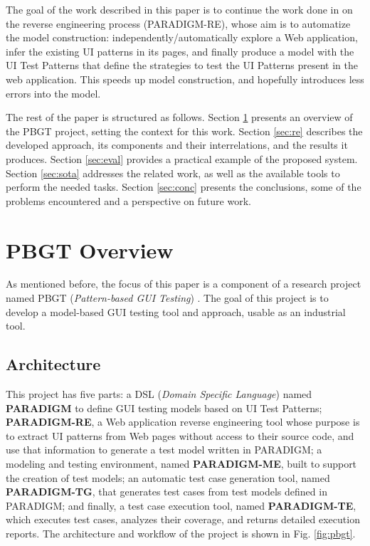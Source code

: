 \documentclass[conference]{IEEEtran}
\begin{document}
The goal of the work described in this paper is to continue the work done in \cite{nabuco2013inferring} on the reverse engineering process (PARADIGM-RE), whose aim is to automatize the model construction: independently/automatically explore a Web application, infer the existing UI patterns in its pages, and finally produce a model with the UI Test Patterns that define the strategies to test the UI Patterns present in the web application. This speeds up model construction, and hopefully introduces less errors into the model.

The rest of the paper is structured as follows. Section \ref{sec:pbgt} presents an overview of the PBGT project, setting the context for this work.  Section \ref{sec:re} describes the developed approach, its components and  their interrelations, and the results it produces. Section \ref{sec:eval} provides a practical example of the proposed system. Section \ref{sec:sota} addresses the related work, as well as the available tools to perform the needed tasks. Section \ref{sec:conc} presents the conclusions, some of the problems encountered and a perspective on future work. 

\section{PBGT Overview}\label{sec:pbgt}

As mentioned before, the focus of this paper is a component of a research project named PBGT (\textit{Pattern-based GUI Testing}) \cite{moreira2013pattern}. The goal of this project is to develop a model-based GUI testing tool and approach, usable as an industrial tool.

\subsection{Architecture}
This project has five parts: a DSL (\textit{Domain Specific Language}) named \textbf{PARADIGM} to define GUI testing models based on UI Test Patterns; \textbf{PARADIGM-RE}, a Web application reverse engineering tool whose purpose is to extract UI patterns from Web pages without access to their source code, and use that information to generate a test model written in PARADIGM; a modeling and testing environment, named \textbf{PARADIGM-ME}, built to support the creation of test models; an automatic test case generation tool, named \textbf{PARADIGM-TG}, that generates test cases from test models defined in PARADIGM; and finally, a test case execution tool, named \textbf{PARADIGM-TE}, which executes test cases, analyzes their coverage, and returns detailed execution reports. The architecture and workflow of the project is shown in Fig. \ref{fig:pbgt}.
\end{document}
